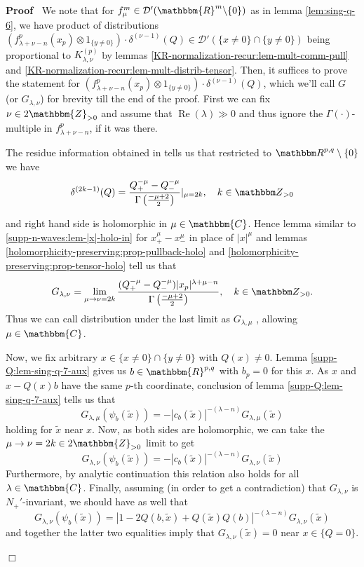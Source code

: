 \documentclass{article}
\newcommand{\tmop}[1]{\ensuremath{\operatorname{#1}}}
\newenvironment{proof}{\noindent\textbf{Proof\ }}{\hspace*{\fill}$\Box$\medskip}
\numberwithin{definition}{section}
\numberwithin{lemma}{section}
\numberwithin{proposition}{section}
{\theorembodyfont{\rmfamily}\newtheorem{remark}{Remark}
\numberwithin{remark}{section}
}
\begin{document}
\begin{proof}
  We note that for $f_{\mu}^m \in \mathcal{D}' ( \mathbbm{R}^m \backslash \{ 0
  \})$ as in lemma \ref{lem:sing-q-6}, we have product of distributions $(
  f_{\lambda + \nu - n}^p ( x_p) \otimes 1_{\{ y \neq 0 \}}) \cdot \delta^{(
  \nu - 1)} ( Q) \in \mathcal{D}' ( \{ x \neq 0 \} \cap \{ y \neq 0 \})$ being
  proportional to $K_{\lambda, \nu}^{( p)}$ by lemmas
  \ref{KR-normalization-recur:lem-mult-comm-pull} and
  \ref{KR-normalization-recur:lem-mult-distrib-tensor}. Then, it suffices to
  prove the statement for $( f_{\lambda + \nu - n}^p ( x_p) \otimes 1_{\{ y
  \neq 0 \}}) \cdot \delta^{( \nu - 1)} ( Q)$, which we'll call $G$ (or
  $G_{\lambda, \nu}$) for brevity till the end of the proof. First we can fix
  $\nu \in 2\mathbbm{Z}_{> 0}$ and assume that $\tmop{Re} ( \lambda) \gg 0$
  and thus ignore the $\Gamma ( \cdot)$-multiple in $f_{\lambda + \nu - n}^p$,
  if it was there.
  
  The residue information obtained in {\cite[ch. III, sec
  2.2]{gelfand1980distribution}} tells us that restricted to $\R^{p, q}
  \setminus \{ 0 \}$ we have
  \[ \delta^{(2 k - 1)} (Q) = \frac{Q_+^{- \mu} - Q_-^{- \mu}}{\Gamma \left(
     \frac{- \mu + 2}{2} \right)} |_{\mu = 2 k}, \hspace{1em} k \in \Z_{> 0}
  \]
  
  
  and right hand side is holomorphic in $\mu \in \mathbbm{C}$. Hence lemma
  similar to \ref{supp-n-waves:lem-|x|-holo-in} for $x_+^{\mu} - x_-^{\mu}$ in
  place of $| x |^{\mu}$ and lemmas
  \ref{holomorphicity-preserving:prop-pullback-holo} and
  \ref{holomorphicity-preserving:prop-tensor-holo} tell us that
  \[ G_{\lambda, \nu_{}} = \lim_{\mu \to \nu = 2 k}  \frac{( Q_+^{- \mu} -
     Q_-^{- \mu}) | x_p |^{\lambda + \mu - n}}{\Gamma \left( \frac{- \mu +
     2}{2} \right)}, \hspace{1em} k \in \Z_{> 0} . \]
  Thus we can call distribution under the last limit as $G_{\lambda, \mu}$ ,
  allowing $\mu \in \mathbbm{C}$.
  
  Now, we fix arbitrary $x \in \{ x \neq 0 \} \cap \{ y \neq 0 \}$ with $Q (
  x) \neq 0$. Lemma \ref{supp-Q:lem-sing-q-7-aux} gives us $b \in
  \mathbbm{R}^{p, q}$ with $b_p = 0$ for this $x$. As $x$ and $x - Q ( x) b$
  have the same $p$-th coordinate, conclusion of lemma
  \ref{supp-Q:lem-sing-q-7-aux} tells us that
  \[ G_{\lambda, \mu} ( \psi_b ( \tilde{x})) = - | c_b ( \tilde{x}) |^{- (
     \lambda - n)} G_{\lambda, \mu} ( \tilde{x}) \]
  holding for $\tilde{x}$ near $x$. Now, as both sides are holomorphic, we can
  take the $\mu \rightarrow \nu = 2 k \in 2\mathbbm{Z}_{> 0}$ limit to get
  \[ G_{\lambda, \nu} ( \psi_b ( \tilde{x})) = - | c_b ( \tilde{x}) |^{- (
     \lambda - n)} G_{\lambda, \nu} ( \tilde{x}) \]
  Furthermore, by analytic continuation this relation also holds for all
  $\lambda \in \mathbbm{C}$. Finally, assuming (in order to get a
  contradiction) that $G_{\lambda, \nu}$ is $N_+'$-invariant, we should have
  as well that
  \[ G_{\lambda, \nu} ( \psi_b ( \tilde{x})) = | 1 - 2 Q ( b, \tilde{x}) + Q (
     \tilde{x}) Q ( b) |^{- ( \lambda - n)} G_{\lambda, \nu} ( \tilde{x}) \]
  and together the latter two equalities imply that $G_{\lambda, \nu} (
  \tilde{x}) = 0$ near $x \in \{ Q = 0 \}$.
  

\end{proof}
\end{document}
